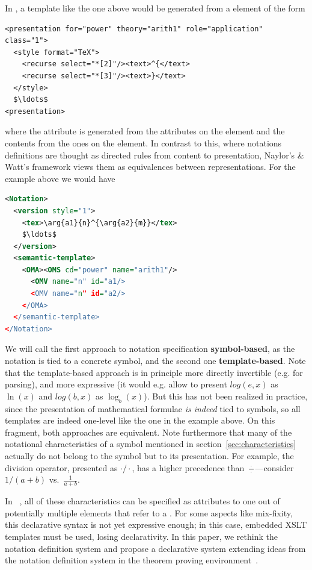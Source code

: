 \documentclass[a4paper]{article}
\def\defemph#1{{\bf{#1}}}
\begin{document}
In {\omdoc}, a template like the one above would be generated from a
{} element of the form
\begin{lstlisting}[mathescape]
<presentation for="power" theory="arith1" role="application" class="1">
  <style format="TeX">
    <recurse select="*[2]"/><text>^{</text>
    <recurse select="*[3]"/><text>}</text>
  </style>
  $\ldots$
<presentation>
\end{lstlisting}
where the {} attribute is generated from the
attributes on the {} element and the contents from the ones on the
{} element. In contrast to this, where notations definitions are thought as
directed rules from content to presentation, Naylor's \& Watt's framework views them as
equivalences between representations. For the example above we would have
\begin{lstlisting}[mathescape,language=XML,morekeywords={Notation,version,semantic-template},
caption=A Template-Based Notation Definition,label=lst:template-based]
<Notation>
  <version style="1">
    <tex>\arg{a1}{n}^{\arg{a2}{m}}</tex>
    $\ldots$
  </version>
  <semantic-template>
    <OMA><OMS cd="power" name="arith1"/>
      <OMV name="n" id="a1/>
      <OMV name="n" id="a2/>
    </OMA>
  </semantic-template>
</Notation>
\end{lstlisting}
We will call the first approach to notation specification {\defemph{symbol-based}}, as the
notation is tied to a concrete symbol, and the second one {\defemph{template-based}}. Note
that the template-based approach is in principle more directly invertible (e.g. for
parsing), and more expressive (it would e.g. allow to present $log(e,x)$ as $\ln(x)$ and
$log(b,x)$ as $\log_b(x)$). But this has not been realized in practice, since the
presentation of mathematical formulae {\emph{is indeed}} tied to symbols, so all templates
are indeed one-level like the one in the example above. On this fragment, both approaches
are equivalent. Note furthermore that many of the notational characteristics of a symbol
mentioned in section~\ref{sec:characteristics} actually do not belong to the symbol but to
its presentation. For example, the division operator, presented as $\cdot/\cdot$, has a
higher precedence than $\frac{\;\cdot\;}{\;\cdot\;}$---consider $1/(a+b)$ vs.\
$\frac{1}{a+b}$.

In {}~\cite{Kohlhase:omdoc1.2}, all of these characteristics can be specified
as attributes to one out of potentially multiple {\element{presentation}} elements that
refer to a {\element{symbol}}. For some aspects like mix-fixity, this declarative syntax
is not yet expressive enough; in this case, embedded XSLT templates must be used, losing
declarativity. In this paper, we rethink the notation definition system and propose a
declarative system extending ideas from the notation definition system in the {\isabelle}
theorem proving environment~\cite{Paulson:Isabelle05}.
\end{document}
